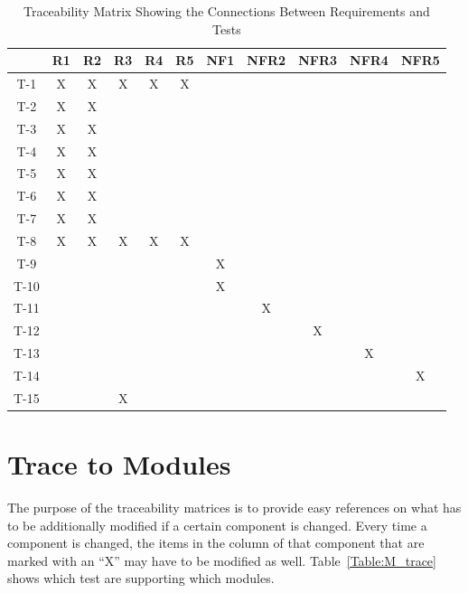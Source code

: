 \documentclass[12pt, titlepage]{article}
\begin{document}
\begin{table}[H]
\centering
\begin{tabular}{||c||c|c|c|c|c|c|c|c|c|c||}
\hline
	& R1 & R2 & R3 & R4 & R5 & NF1 & NFR2 & NFR3 & NFR4 & NFR5 \\
\hline
T-1        	& X& X& X& X& X& & & & & \\
\hline
T-2			& X& X& & & & & & & &\\
\hline
T-3        	& X& X& & & & & & & &\\
\hline
T-4			& X& X& & & & & & &  &\\
\hline
T-5       	& X& X& & & & & & & &\\
\hline
T-6			& X& X& & & & & & & &\\
\hline
T-7        	& X& X& & & & & & & &\\
\hline
T-8			& X& X&X & X& X& & & & &\\ 
\hline
T-9        	& & & & & &X & & & &\\
\hline
T-10 		& & & & & &X & & & &\\
\hline
T-11        	& & & & & & &X & & &\\
\hline
T-12			& & & & & & & &X & &\\ 
\hline
T-13        	& & & & & & & & &X &\\
\hline
T-14			& & & & & & & & & &X\\
\hline
T-15        	& & &X & & & & & & &\\
\hline

\end{tabular}
\caption{Traceability Matrix Showing the Connections Between Requirements and 
Tests}
\label{Table:R_trace}
\end{table}
		
\section{Trace to Modules}	


The purpose of the traceability matrices is to provide easy references on what
has to be additionally modified if a certain component is changed.  Every time a
component is changed, the items in the column of that component that are marked
with an ``X'' may have to be modified as well.  Table~\ref{Table:M_trace} shows 
which test are supporting which modules.
\end{document}
